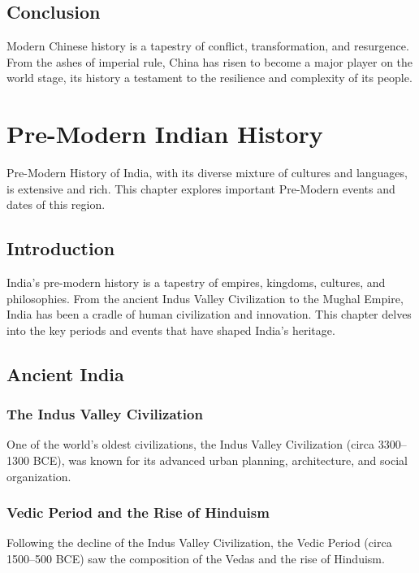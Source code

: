 \documentclass[a4paper,12pt]{book}
\begin{document}
\section{Conclusion}
\label{sec:conclusion}
Modern Chinese history is a tapestry of conflict, transformation, and resurgence. From the ashes of imperial rule, China has risen to become a major player on the world stage, its history a testament to the resilience and complexity of its people.

\chapter{Pre-Modern Indian History}
\label{ch:pre-modern-indian-history}

Pre-Modern History of India, with its diverse mixture of cultures and languages, is extensive and rich. This chapter explores important Pre-Modern events and dates of this region.

\section{Introduction}
\label{sec:introduction-pre-modern-india}
India's pre-modern history is a tapestry of empires, kingdoms, cultures, and philosophies. From the ancient Indus Valley Civilization to the Mughal Empire, India has been a cradle of human civilization and innovation. This chapter delves into the key periods and events that have shaped India’s heritage.

\section{Ancient India}
\label{sec:ancient-india}

\subsection{The Indus Valley Civilization}
One of the world’s oldest civilizations, the Indus Valley Civilization (circa 3300–1300 BCE), was known for its advanced urban planning, architecture, and social organization.

\subsection{Vedic Period and the Rise of Hinduism}
Following the decline of the Indus Valley Civilization, the Vedic Period (circa 1500–500 BCE) saw the composition of the Vedas and the rise of Hinduism.
\end{document}
